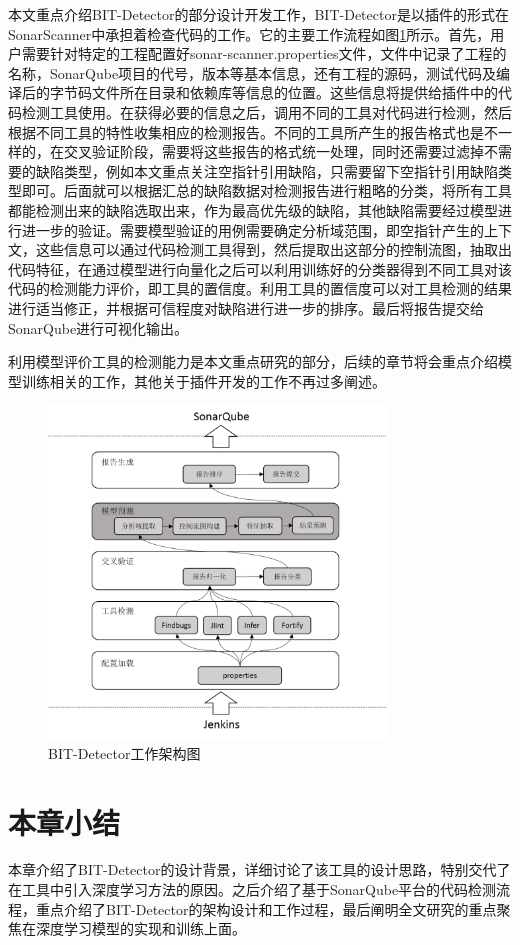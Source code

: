 本文重点介绍BIT-Detector的部分设计开发工作，BIT-Detector是以插件的形式在SonarScanner中承担着检查代码的工作。它的主要工作流程如图\ref{fig:figure3-3}所示。首先，用户需要针对特定的工程配置好sonar-scanner.properties文件，文件中记录了工程的名称，SonarQube项目的代号，版本等基本信息，还有工程的源码，测试代码及编译后的字节码文件所在目录和依赖库等信息的位置。这些信息将提供给插件中的代码检测工具使用。在获得必要的信息之后，调用不同的工具对代码进行检测，然后根据不同工具的特性收集相应的检测报告。不同的工具所产生的报告格式也是不一样的，在交叉验证阶段，需要将这些报告的格式统一处理，同时还需要过滤掉不需要的缺陷类型，例如本文重点关注空指针引用缺陷，只需要留下空指针引用缺陷类型即可。后面就可以根据汇总的缺陷数据对检测报告进行粗略的分类，将所有工具都能检测出来的缺陷选取出来，作为最高优先级的缺陷，其他缺陷需要经过模型进行进一步的验证。需要模型验证的用例需要确定分析域范围，即空指针产生的上下文，这些信息可以通过代码检测工具得到，然后提取出这部分的控制流图，抽取出代码特征，在通过模型进行向量化之后可以利用训练好的分类器得到不同工具对该代码的检测能力评价，即工具的置信度。利用工具的置信度可以对工具检测的结果进行适当修正，并根据可信程度对缺陷进行进一步的排序。最后将报告提交给SonarQube进行可视化输出。

利用模型评价工具的检测能力是本文重点研究的部分，后续的章节将会重点介绍模型训练相关的工作，其他关于插件开发的工作不再过多阐述。


\begin{figure}
	\centering
	\includegraphics[width=0.80\textwidth]{figures/BITDetector3-3}
	\caption{BIT-Detector工作架构图}\label{fig:figure3-3}
\end{figure}

\section{本章小结}

本章介绍了BIT-Detector的设计背景，详细讨论了该工具的设计思路，特别交代了在工具中引入深度学习方法的原因。之后介绍了基于SonarQube平台的代码检测流程，重点介绍了BIT-Detector的架构设计和工作过程，最后阐明全文研究的重点聚焦在深度学习模型的实现和训练上面。
